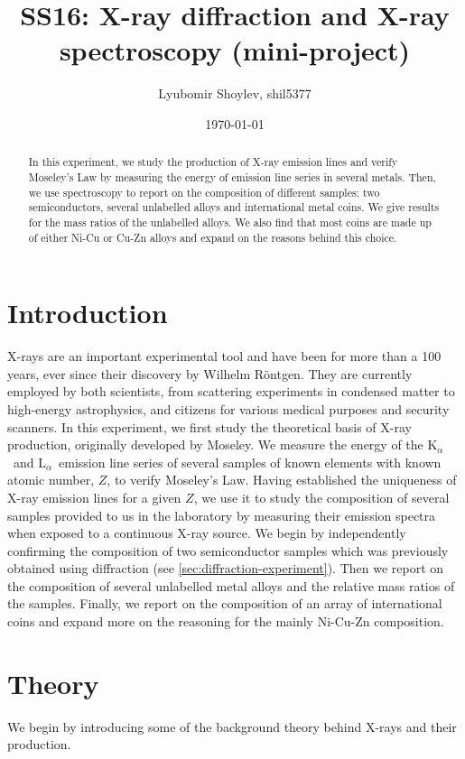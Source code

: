 \documentclass[11pt,a4paper,twoside,onecolumn]{article}
\title{\textbf{SS16: X-ray diffraction and X-ray spectroscopy (mini-project)}}
\author{Lyubomir Shoylev, shil5377}
\date{\today}
\newcommand{\Kalpha}{$\mathrm{K}_\alpha$~}
\newcommand{\Lalpha}{$\mathrm{L}_\alpha$~}
\begin{document}
\maketitle

\begin{abstract}
    In this experiment, we study the production of X-ray emission lines and verify Moseley's Law by measuring the energy of emission line series in several metals. Then, we use spectroscopy to report on the composition of different samples: two semiconductors, several unlabelled alloys and international metal coins. We give results for the mass ratios of the unlabelled alloys. We also find that most coins are made up of either Ni-Cu or Cu-Zn alloys and expand on the reasons behind this choice.
\end{abstract}

\section{Introduction}
X-rays are an important experimental tool and have been for more than a 100 years, ever since their discovery by Wilhelm R\"{o}ntgen. They are currently employed by both scientists, from scattering experiments in condensed matter to high-energy astrophysics, and citizens for various medical purposes and security scanners. In this experiment, we first study the theoretical basis of X-ray production, originally developed by Moseley. We measure the energy of the \Kalpha and \Lalpha emission line series of several samples of known elements with known atomic number, $Z$, to verify Moseley's Law. Having established the uniqueness of X-ray emission lines for a given $Z$, we use it to study the composition of several samples provided to us in the laboratory by measuring their emission spectra when exposed to a continuous X-ray source. We begin by independently confirming the composition of two semiconductor samples which was previously obtained using diffraction (see \ref{sec:diffraction-experiment}). Then we report on the composition of several unlabelled metal alloys and the relative mass ratios of the samples. Finally, we report on the composition of an array of international coins and expand more on the reasoning for the mainly Ni-Cu-Zn composition.

\section{Theory}
We begin by introducing some of the background theory behind X-rays and their production.
\end{document}

